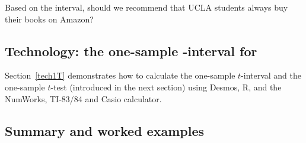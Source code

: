 
\newpage
\begin{exercisewrap}
\begin{nexercise}
Based on the interval, should we recommend that UCLA students always buy their books on Amazon?\footnotemark
\end{nexercise}
\end{exercisewrap}


\subsection[Technology: the one-sample $t$-interval for $\mu$]{Technology:  the one-sample -interval for \pmb{$\mu$}}
\label{1SampTint}

\noindent Section~\ref{tech1T} demonstrates how to calculate the one-sample $t$-interval and the one-sample $t$-test (introduced in the next section) using Desmos, R, and the NumWorks, TI-83/84 and Casio calculator. 

\subsection[Summary and worked examples]{Summary and worked examples}

